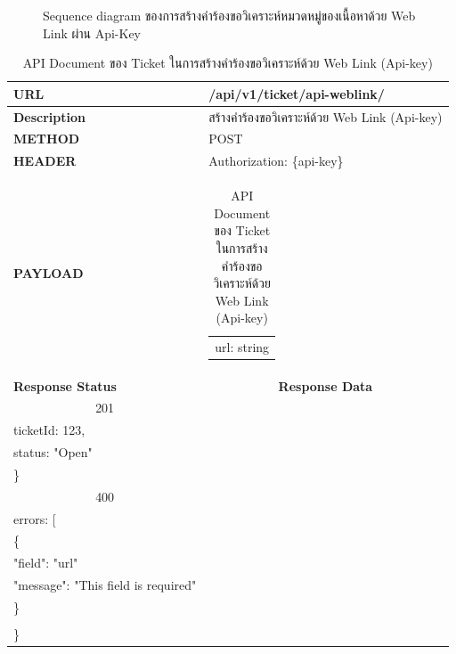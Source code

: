 \documentclass[12pt,oneside,openright,a4paper]{cpe-thai-project}
\begin{document}
\begin{itemize}
\begin{figure}[!ht]
  \caption{Sequence diagram ของการสร้างคำร้องขอวิเคราะห์หมวดหมู่ของเนื้อหาด้วย Web Link ผ่าน Api-Key}\label{fig:seq_weblink_api} 
\end{figure} 
\begin{longtable}[!ht]{p{3cm}|p{8cm}}
  \caption{API Document ของ Ticket ในการสร้างคำร้องขอวิเคราะห์ด้วย Web Link (Api-key)}\label{tbl:api_ticket_key} 
    \endfirsthead
    \endhead
    \hhline{==}  
    \textbf{URL}              & /api/v1/ticket/api-weblink/                                                                                            \\ \hline
    \textbf{Description}      & สร้างคำร้องขอวิเคราะห์ด้วย Web Link (Api-key)                                                                                     \\ \hline
    \textbf{METHOD}           & POST                                                                                                                 \\ \hline
    \textbf{HEADER}           & Authorization: \{api-key\}                                                                                         \\ \hline
    \textbf{PAYLOAD}          & \begin{tabular}[c]{@{}l@{}}url: string\end{tabular}  \\ \hline \newpage \hline
    \textbf{Response Status}  & \multicolumn{1}{c}{\textbf{Response Data}}                                                                          \\ \hline
    \multicolumn{1}{c|}{201}  & \begin{tabular}[c]{@{}l@{}}\{\\ \quad ticketId: 123,\\ \quad status: "Open"\\ \}\end{tabular}                                 \\ \hline
    \multicolumn{1}{c|}{400}  &
    \begin{tabular}[c]{@{}l@{}}\{\\ \quad errors: {[}\\ \quad\quad\{\\ \quad\quad\quad "field": "url"\\ \quad\quad\quad "message": "This field is required"\\ \quad\quad \}\\ \quad{]}\\\}\end{tabular} \\ \hline

\end{longtable}
\end{itemize}
\end{document}
